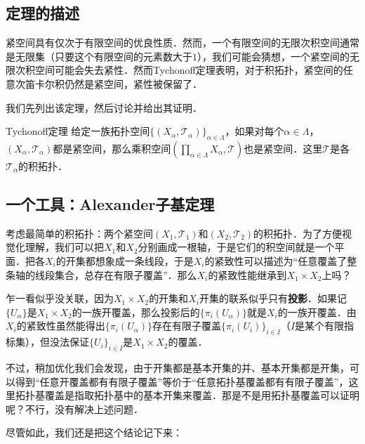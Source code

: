 

\subsection{定理的描述}

紧空间具有仅次于有限空间的优良性质．然而，一个有限空间的无限次积空间通常是无限集（只要这个有限空间的元素数大于$1$），我们可能会猜想，一个紧空间的无限次积空间可能会失去紧性．然而Tychonoff定理表明，对于积拓扑，紧空间的任意次笛卡尔积仍然是紧空间，紧性被保留了．

我们先列出该定理，然后讨论并给出其证明．

\begin{theorem}{Tychonoff定理}
给定一族拓扑空间$\{(X_\alpha, \mathcal{T}_\alpha)\}_{\alpha\in \Lambda}$，如果对每个$\alpha\in\Lambda$，$(X_\alpha, \mathcal{T}_\alpha)$都是紧空间，那么乘积空间$(\prod_{\alpha\in\Lambda}X_\alpha, \mathcal{T})$也是紧空间．这里$\mathcal{T}$是各$\mathcal{T}_\alpha$的积拓扑．
\end{theorem}



\subsection{一个工具：Alexander子基定理}

考虑最简单的积拓扑：两个紧空间$(X_1, \mathcal{T}_1)$和$(X_2, \mathcal{T}_2)$的积拓扑．为了方便视觉化理解，我们可以把$X_1$和$X_2$分别画成一根轴，于是它们的积空间就是一个平面．把各$X_i$的开集都想象成一条线段，于是$X_i$的紧致性可以描述为“任意覆盖了整条轴的线段集合，总存在有限子覆盖”．那么$X_i$的紧致性能继承到$X_1\times X_2$上吗？

乍一看似乎没关联，因为$X_1\times X_2$的开集和$X_i$开集的联系似乎只有\textbf{投影}．如果记$\{U_\alpha\}$是$X_1\times X_2$的一族开覆盖，那么投影后的$\{\pi_i(U_\alpha)\}$就是$X_i$的一族开覆盖．由$X_i$的紧致性虽然能得出$\{\pi_i(U_\alpha)\}$存在有限子覆盖$\{\pi_i(U_i)\}_{i\in I}$（$I$是某个有限指标集），但没法保证$\{U_i\}_{i\in I}$是$X_1\times X_2$的覆盖．

不过，稍加优化我们会发现，由于开集都是基本开集的并、基本开集都是开集，可以得到“任意开覆盖都有有限子覆盖”等价于“任意拓扑基覆盖都有有限子覆盖”，这里拓扑基覆盖是指取拓扑基中的基本开集来覆盖．那是不是用拓扑基覆盖可以证明呢？不行，没有解决上述问题．

尽管如此，我们还是把这个结论记下来：

